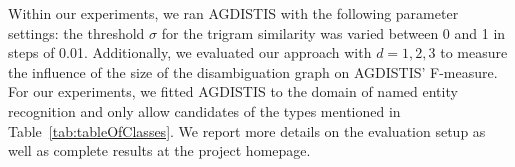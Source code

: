 \documentclass{llncs}
\begin{document}
Within our experiments, we ran AGDISTIS with the following parameter settings: 
the threshold $\sigma$ for the trigram similarity was varied between 0 and 1 in steps of 0.01. 
Additionally, we evaluated our approach with $d=1,2,3$ to measure the influence of the size of the disambiguation graph on AGDISTIS' F-measure.
For our experiments, we fitted AGDISTIS to the domain of named entity recognition and only allow candidates of the types mentioned in Table~\ref{tab:tableOfClasses}.
We report more details on the evaluation setup as well as complete results at the project homepage.
\end{document}

